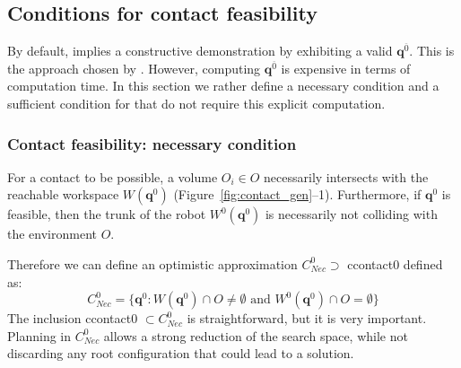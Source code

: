 


   
 
\subsection{Conditions for contact feasibility}
By default,  implies a constructive demonstration by exhibiting a valid $\mathbf{q}^{\overline{0}}$. This is the approach chosen by \cite{Bouyarmane2009}. However, computing $\mathbf{q}^{\overline{0}}$ is expensive in terms of computation time. In this section we rather define a necessary condition and a sufficient condition for  that do not require this explicit computation.




\subsubsection*{Contact feasibility: necessary condition}
For a contact to be possible, a volume $O_i \in O$ necessarily intersects with the reachable workspace $W(\mathbf{q}^{0})$ (Figure~\ref{fig:contact_gen}--1). Furthermore, if $\mathbf{q}^{0}$ is  feasible, then the trunk of the robot $W^0(\mathbf{q}^{0})$ is necessarily not colliding  with the environment $O$.

Therefore we can define an optimistic approximation  $C^0_{Nec} \supset$ \gls{ccontact0} defined as: 
\begin{equation}
C_{Nec}^0 = \{ \mathbf{q}^0 : W(\mathbf{q}^{0}) \cap O \neq \emptyset \text{ and } W^0(\mathbf{q}^{0}) \cap O = \emptyset \} %
\end{equation}
The inclusion \gls{ccontact0} $\subset C^0_{Nec}$ is straightforward, but it is very important.
Planning in $C^0_{Nec}$ allows a strong reduction of the search space, while not discarding 
any root configuration that could lead to a solution.
 
